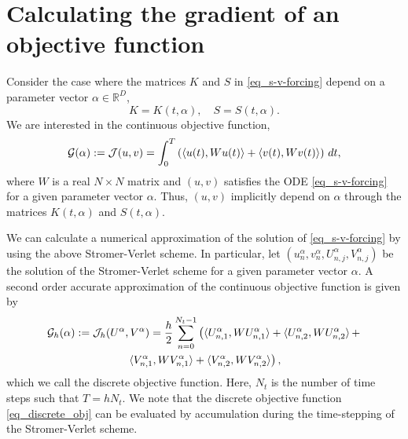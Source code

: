 \documentclass[11pt]{article}
\begin{document}
\section{Calculating the gradient of an objective function}

Consider the case where the matrices $K$ and $S$ in \eqref{eq_s-v-forcing} depend on a parameter
vector $\alpha \in {\mathbb R}^D$,
\[
K = K(t,\alpha),\quad S = S(t,\alpha).
\]
We are interested in the continuous objective function,
\[
{\cal G}(\alpha) := {\cal J}(u, v) = \int_{0}^T \left( \langle u(t),W u(t) \rangle +  \langle v(t),W v(t) \rangle\right)\, dt,
\]
where $W$ is a real $N\times N$ matrix and $(u,v)$ satisfies the ODE \eqref{eq_s-v-forcing} for a
given parameter vector $\alpha$. Thus, $(u,v)$ implicitly depend on $\alpha$ through the matrices
$K(t,\alpha)$ and $S(t,\alpha)$.

We can calculate a numerical approximation of the solution of \eqref{eq_s-v-forcing} by
using the above Stromer-Verlet scheme. In particular, let $(u^\alpha_n, v^\alpha_n, U^\alpha_{n,j}, V^\alpha_{n,j})$ be the solution of
the Stromer-Verlet scheme for a given parameter vector $\alpha$. A second order accurate approximation of the continuous
objective function is given by
\begin{multline}\label{eq_discrete_obj}
  {\cal G}_h(\alpha) :=  {\cal J}_h(U^\alpha, V^\alpha) 
  = \frac{h}{2} \sum_{n=0}^{N_t-1}
%
  \left( \langle U^\alpha_{n,1}, W U^\alpha_{n,1}\rangle +  \langle U^\alpha_{n,2}, W U^\alpha_{n,2}\rangle\, + \right.\\
  \left.  \langle V^\alpha_{n,1}, W V^\alpha_{n,1}\rangle + \langle V^\alpha_{n,2}, W V^\alpha_{n,2}\rangle
%
\right),
\end{multline}
which we call the discrete objective function. Here, $N_t$ is the number of time steps such that
$T=h N_t$.  We note that the discrete objective function \eqref{eq_discrete_obj} can be evaluated by
accumulation during the time-stepping of the Stromer-Verlet scheme.
\end{document}
